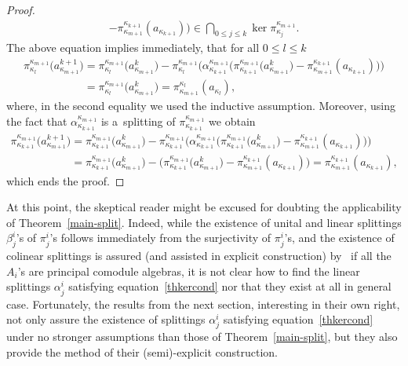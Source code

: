 \documentclass[pdftex]{sigma}
\begin{document}
\begin{proof}
\begin{gather*}
-\pi^{\kappa_{k+1}}_{\kappa_{m+1}}(a_{\kappa_{k+1}})
\big)\in \bigcap_{0\leq j\leq k}\ker\pi^{\kappa_{m+1}}_{\kappa_j}.
\end{gather*}
The above equation implies immediately, that for all $0\leq l\leq k$
\begin{gather*}
\pi^{\kappa_{m+1}}_{\kappa_l}\big(a^{k+1}_{\kappa_{m+1}}\big)
= \pi^{\kappa_{m+1}}_{\kappa_l}\big(a_{\kappa_{m+1}}^k\big)-\pi^{\kappa_{m+1}}_{\kappa_l}\big(\alpha^{\kappa_{m+1}}_{\kappa_{k+1}}
\big(\pi^{\kappa_{m+1}}_{\kappa_{k+1}}\big(a^k_{\kappa_{m+1}}\big)-\pi^{\kappa_{k+1}}_{\kappa_{m+1}}(a_{\kappa_{k+1}})\big)\big)
\\
\phantom{\pi^{\kappa_{m+1}}_{\kappa_l}\big(a^{k+1}_{\kappa_{m+1}}\big)}{}
 =\pi^{\kappa_{m+1}}_{\kappa_l}\big(a_{\kappa_{m+1}}^k\big)
 =\pi^{\kappa_l}_{\kappa_{m+1}}(a_{\kappa_l}),
\end{gather*}
where, in the second equality we used the inductive assumption.
Moreover, using the fact that $\alpha^{\kappa_{m+1}}_{\kappa_{k+1}}$ is a~splitting of
$\pi^{\kappa_{m+1}}_{\kappa_{k+1}}$ we obtain
\begin{gather*}
\pi^{\kappa_{m+1}}_{\kappa_{k+1}}\big(a^{k+1}_{\kappa_{m+1}}\big)
= \pi^{\kappa_{m+1}}_{\kappa_{k+1}}\big(a_{\kappa_{m+1}}^k\big)-\pi^{\kappa_{m+1}}_{\kappa_{k+1}}\big(\alpha^{\kappa_{m+1}}_{\kappa_{k+1}}
\big(\pi^{\kappa_{m+1}}_{\kappa_{k+1}}\big(a^k_{\kappa_{m+1}}\big)-\pi^{\kappa_{k+1}}_{\kappa_{m+1}}(a_{\kappa_{k+1}})\big)\big)
\\
\phantom{\pi^{\kappa_{m+1}}_{\kappa_{k+1}}\big(a^{k+1}_{\kappa_{m+1}}\big)}
 =\pi^{\kappa_{m+1}}_{\kappa_{k+1}}\big(a_{\kappa_{m+1}}^k\big) -
\big(\pi^{\kappa_{m+1}}_{\kappa_{k+1}}\big(a^k_{\kappa_{m+1}}\big)-\pi^{\kappa_{k+1}}_{\kappa_{m+1}}(a_{\kappa_{k+1}})\big)
 =\pi^{\kappa_{k+1}}_{\kappa_{m+1}}(a_{\kappa_{k+1}}),
\end{gather*}
which ends the proof.
\end{proof}

At this point, the skeptical reader might be excused for doubting the applicability of Theorem~\ref{main-split}.
Indeed, while the existence of unital and linear splittings $\beta^i_j$'s of $\pi^i_j$'s follows immediately from the
surjectivity of $\pi^i_j$'s, and the existence of colinear splittings is assured (and assisted in explicit construction)
by~\cite[Lemma~3.1]{hkmz11} if all the $A_i$'s are principal comodule algebras, it is not clear how to f\/ind the linear
splittings $\alpha^i_j$ satisfying equation~\eqref{thkercond} nor that they exist at all in general case.
Fortunately, the results from the next section, interesting in their own right, not only assure the existence of
splittings $\alpha^i_j$ satisfying equation~\eqref{thkercond} under no stronger assumptions than those of
Theorem~\ref{main-split}, but they also provide the method of their (semi)-explicit construction.
\end{document}
